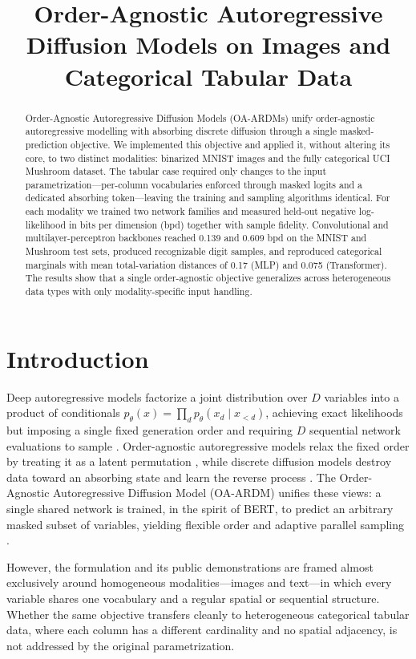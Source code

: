 \documentclass[conference]{IEEEtran}
\title{Order-Agnostic Autoregressive Diffusion Models on Images and Categorical Tabular Data}
\author{\IEEEauthorblockN{Jorge Barcenilla \quad Santiago Prieto}
\IEEEauthorblockA{Probabilistic Machine Learning, Universidad Carlos III de Madrid\\ Project~I}}
\begin{document}
\maketitle

\begin{abstract}
Order-Agnostic Autoregressive Diffusion Models (OA-ARDMs) unify order-agnostic
autoregressive modelling with absorbing discrete diffusion through a single
masked-prediction objective. We implemented this objective and applied it,
without altering its core, to two distinct modalities: binarized MNIST images
and the fully categorical UCI Mushroom dataset. The tabular case required only
changes to the input parametrization---per-column vocabularies enforced through
masked logits and a dedicated absorbing token---leaving the training and
sampling algorithms identical. For each modality we trained two network
families and measured held-out negative log-likelihood in bits per dimension
(bpd) together with sample fidelity. Convolutional and multilayer-perceptron
backbones reached 0.139 and 0.609 bpd on the MNIST and Mushroom test sets,
produced recognizable digit samples, and reproduced categorical marginals with
mean total-variation distances of 0.17 (MLP) and 0.075 (Transformer). The results show that a single
order-agnostic objective generalizes across heterogeneous data types with only
modality-specific input handling.
\end{abstract}

\section{Introduction}
Deep autoregressive models factorize a joint distribution over $D$ variables
into a product of conditionals $p_\theta(x)=\prod_{d} p_\theta(x_d\mid
x_{<d})$, achieving exact likelihoods but imposing a single fixed generation
order and requiring $D$ sequential network evaluations to sample
\cite{made,pixelcnn}. Order-agnostic autoregressive models relax the fixed
order by treating it as a latent permutation \cite{uria}, while discrete
diffusion models destroy data toward an absorbing state and learn the reverse
process \cite{d3pm}. The Order-Agnostic Autoregressive Diffusion Model
(OA-ARDM) unifies these views: a single shared network is trained, in the
spirit of BERT, to predict an arbitrary masked subset of variables, yielding
flexible order and adaptive parallel sampling \cite{ardm}.

However, the formulation and its public demonstrations are framed almost
exclusively around homogeneous modalities---images and text---in which every
variable shares one vocabulary and a regular spatial or sequential structure.
Whether the same objective transfers cleanly to heterogeneous categorical
tabular data, where each column has a different cardinality and no spatial
adjacency, is not addressed by the original parametrization.
\end{document}
